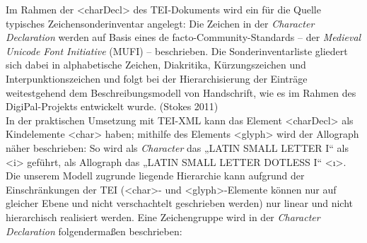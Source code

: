 \documentclass{article}
\begin{document}
        Im Rahmen der <charDecl> des TEI-Dokuments
                  wird ein für die Quelle typisches Zeichensonderinventar angelegt: Die Zeichen in
                  der \emph{Character Declaration} werden auf Basis eines de
                  facto-Community-Standards – der \emph{Medieval Unicode Font
                     Initiative} (MUFI) – beschrieben. Die Sonderinventarliste gliedert sich
                  dabei in alphabetische Zeichen, Diakritika, Kürzungszeichen und
                  Interpunktionszeichen und folgt bei der Hierarchisierung der Einträge
                  weitestgehend dem Beschreibungsmodell von Handschrift, wie es im Rahmen des
                  DigiPal-Projekts entwickelt wurde. (Stokes 2011)\\
            
        In der praktischen Umsetzung mit TEI-XML kann das Element <charDecl> als Kindelemente <char> haben; mithilfe des Elements <glyph> wird der Allograph näher beschrieben: So wird als \emph{Character} das „LATIN SMALL LETTER I“ als <i> geführt,
                  als Allograph das „LATIN SMALL LETTER DOTLESS I“ <ı>. Die unserem Modell
                  zugrunde liegende Hierarchie kann aufgrund der Einschränkungen der TEI (<char>- und <glyph>-Elemente können nur auf gleicher Ebene und nicht
                  verschachtelt geschrieben werden) nur linear und nicht hierarchisch realisiert
                  werden. Eine Zeichengruppe wird in der \emph{Character
                     Declaration} folgendermaßen beschrieben:\\
            
\end{document}
